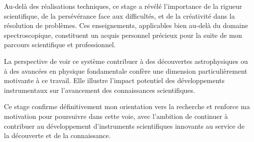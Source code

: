 Au-delà des réalisations techniques, ce stage a révélé l'importance de la rigueur scientifique, de la persévérance face aux difficultés, et de la créativité dans la résolution de problèmes. Ces enseignements, applicables bien au-delà du domaine spectroscopique, constituent un acquis personnel précieux pour la suite de mon parcours scientifique et professionnel.

La perspective de voir ce système contribuer à des découvertes astrophysiques ou à des avancées en physique fondamentale confère une dimension particulièrement motivante à ce travail. Elle illustre l'impact potentiel des développements instrumentaux sur l'avancement des connaissances scientifiques.

Ce stage confirme définitivement mon orientation vers la recherche et renforce ma motivation pour poursuivre dans cette voie, avec l'ambition de continuer à contribuer au développement d'instruments scientifiques innovants au service de la découverte et de la connaissance.